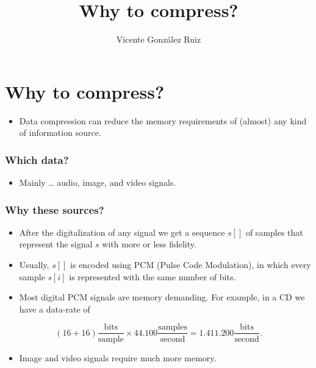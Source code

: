 
\title{Why to compress?}
\author{Vicente González Ruiz}

\maketitle
\tableofcontents

\section{Why to compress?}
\begin{itemize}
\item
  Data compression can reduce the memory requirements of (almost) any
  kind of information source.
\end{itemize}

\subsubsection{Which data?}\label{which-data}
\begin{itemize}
\item
  Mainly \ldots{} audio, image, and video signals.
\end{itemize}

\subsubsection{Why these sources?}

\begin{itemize}
\item
  After the digitalization of any signal we get a sequence \(s[]\) of
  samples that represent the signal \(s\) with more or less fidelity.
\item
  Usually, \(s[]\) is encoded using PCM (Pulse Code Modulation), in
  which every sample \(s[i]\) is represented with the same number of
  bits.
\item
  Most digital PCM signals are memory demanding. For example, in a CD we
  have a data-rate of
\end{itemize}

\begin{equation}
    (16+16)\frac{\text{bits}}{\text{sample}}\times
    44{.}100\frac{\text{samples}}{\text{second}}=
    1{.}411{.}200\frac{\text{bits}}{\text{second}}.
\end{equation}

\begin{itemize}
\tightlist
\item
  Image and video signals require much more memory.
\end{itemize}

